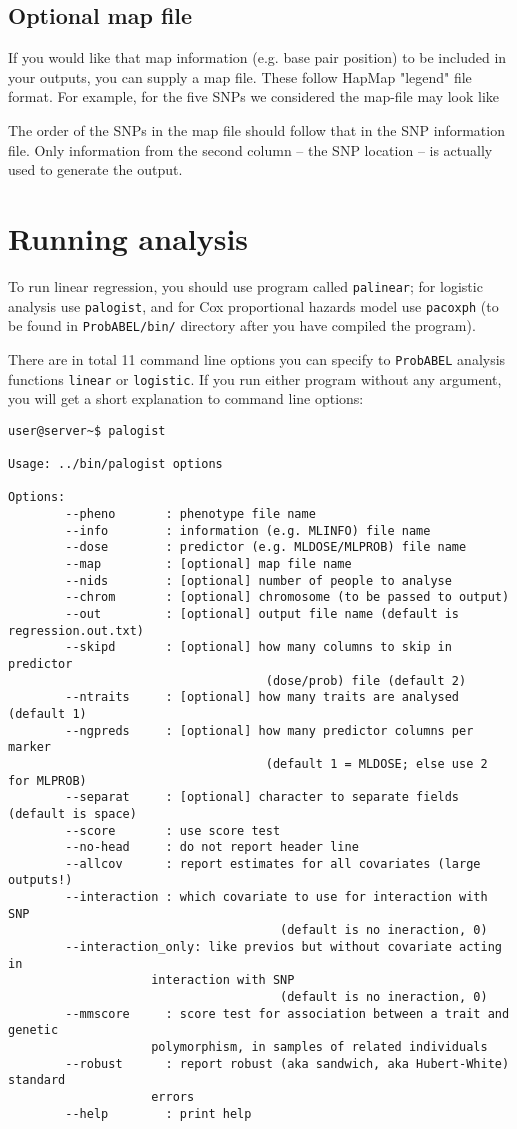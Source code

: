 \documentclass[12pt]{article}
\begin{document}
\subsection{Optional map file}
If you would like that map information (e.g. base pair position) to 
be included in your outputs, you can supply a map file. These follow 
HapMap "legend" file format. For example, for the five SNPs we considered 
the map-file may look like



The order of the SNPs in the map file should follow that in the SNP information 
file. Only information from the second column -- the SNP location -- is 
actually used to generate the output.

\section{Running analysis}

To run linear regression, you should use program called \texttt{palinear};
for logistic analysis use \texttt{palogist}, and for Cox proportional 
hazards model use \texttt{pacoxph} (to be found in 
\texttt{ProbABEL/bin/} directory after you have compiled the program).

There are in total 11 command line options you can specify to \texttt{ProbABEL} 
analysis functions \texttt{linear} or \texttt{logistic}. If you run 
either program without any argument, you 
will get a short explanation to command line options:

\begin{verbatim}
user@server~$ palogist

Usage: ../bin/palogist options

Options:
		--pheno       : phenotype file name
		--info        : information (e.g. MLINFO) file name
		--dose        : predictor (e.g. MLDOSE/MLPROB) file name
		--map         : [optional] map file name
		--nids        : [optional] number of people to analyse
		--chrom       : [optional] chromosome (to be passed to output)
		--out         : [optional] output file name (default is regression.out.txt)
		--skipd       : [optional] how many columns to skip in predictor
								    (dose/prob) file (default 2)
		--ntraits     : [optional] how many traits are analysed (default 1)
		--ngpreds     : [optional] how many predictor columns per marker
								    (default 1 = MLDOSE; else use 2 for MLPROB)
		--separat     : [optional] character to separate fields (default is space)
		--score       : use score test
		--no-head     : do not report header line
		--allcov      : report estimates for all covariates (large outputs!)
		--interaction : which covariate to use for interaction with SNP
									  (default is no ineraction, 0)
		--interaction_only: like previos but without covariate acting in
                    interaction with SNP
									  (default is no ineraction, 0)
		--mmscore     : score test for association between a trait and genetic
                    polymorphism, in samples of related individuals	
		--robust      : report robust (aka sandwich, aka Hubert-White) standard 
                    errors
		--help        : print help

\end{verbatim}
\end{document}
